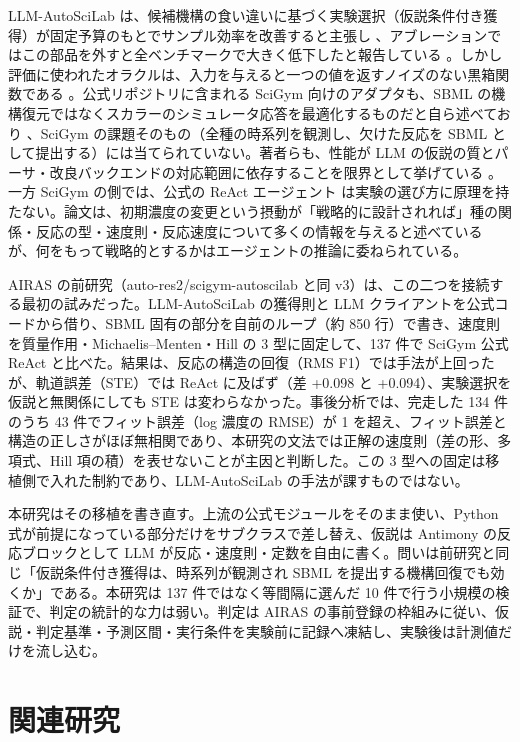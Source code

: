 \documentclass{article}
\providecommand{\unverified}[1]{#1}
\begin{document}
LLM-AutoSciLab は、候補機構の食い違いに基づく実験選択（仮説条件付き獲得）が固定予算のもとでサンプル効率を改善すると主張し \cite[s2.p2]{kabra-2026-llm}、アブレーションではこの部品を外すと全ベンチマークで大きく低下したと報告している \cite[s2.p7]{kabra-2026-llm}。しかし評価に使われたオラクルは、入力を与えると一つの値を返すノイズのない黒箱関数である \cite[s2.p5]{kabra-2026-llm}。公式リポジトリに含まれる SciGym 向けのアダプタも、SBML の機構復元ではなくスカラーのシミュレータ応答を最適化するものだと自ら述べており \cite[s2.p14]{kabra-2026-llm}、SciGym の課題そのもの（全種の時系列を観測し、欠けた反応を SBML として提出する）には当てられていない。著者らも、性能が LLM の仮説の質とパーサ・改良バックエンドの対応範囲に依存することを限界として挙げている \cite[s2.p8]{kabra-2026-llm}。一方 SciGym の側では、公式の ReAct エージェント \cite[s1.p3]{duan-2025-measuring} は実験の選び方に原理を持たない。論文は、初期濃度の変更という摂動が「戦略的に設計されれば」種の関係・反応の型・速度則・反応速度について多くの情報を与えると述べている \cite[s1.p8]{duan-2025-measuring} が、何をもって戦略的とするかはエージェントの推論に委ねられている。

AIRAS の前研究（auto-res2/scigym-autoscilab と同 v3）は、この二つを接続する最初の試みだった。LLM-AutoSciLab の獲得則と LLM クライアントを公式コードから借り、SBML 固有の部分を自前のループ（約 850 行）で書き、速度則を質量作用・Michaelis--Menten・Hill の 3 型に固定して、137 件で SciGym 公式 ReAct と比べた。結果は、反応の構造の回復（RMS F1）では手法が上回ったが、軌道誤差（STE）では ReAct に及ばず（差 \unverified{+0.098} と \unverified{+0.094}）、実験選択を仮説と無関係にしても STE は変わらなかった。事後分析では、完走した 134 件のうち 43 件でフィット誤差（log 濃度の RMSE）が 1 を超え、フィット誤差と構造の正しさがほぼ無相関であり、本研究の文法では正解の速度則（差の形、多項式、Hill 項の積）を表せないことが主因と判断した。この 3 型への固定は移植側で入れた制約であり、LLM-AutoSciLab の手法が課すものではない。

本研究はその移植を書き直す。上流の公式モジュールをそのまま使い、Python 式が前提になっている部分だけをサブクラスで差し替え、仮説は Antimony の反応ブロックとして LLM が反応・速度則・定数を自由に書く。問いは前研究と同じ「仮説条件付き獲得は、時系列が観測され SBML を提出する機構回復でも効くか」である。本研究は 137 件ではなく等間隔に選んだ 10 件で行う小規模の検証で、判定の統計的な力は弱い。判定は AIRAS の事前登録の枠組みに従い、仮説・判定基準・予測区間・実行条件を実験前に記録へ凍結し、実験後は計測値だけを流し込む。

\section{関連研究}
\label{sec:related}
\end{document}
